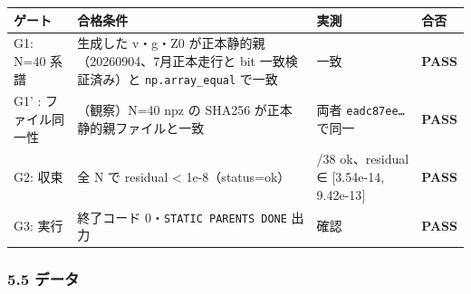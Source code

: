 \documentclass[
  a4paper,
]{ltjsarticle}
\newcounter{none} %
\begin{document}
{\def\LTcaptype{none} %
\begin{longtable}[]{@{}
  >{\raggedright\arraybackslash}p{}
  >{\raggedright\arraybackslash}p{}
  >{\raggedright\arraybackslash}p{}
  >{\raggedright\arraybackslash}p{}@{}}
\toprule\noalign{}
\begin{minipage}[b]{\linewidth}\raggedright
ゲート
\end{minipage} & \begin{minipage}[b]{\linewidth}\raggedright
合格条件
\end{minipage} & \begin{minipage}[b]{\linewidth}\raggedright
実測
\end{minipage} & \begin{minipage}[b]{\linewidth}\raggedright
合否
\end{minipage} \\
\midrule\noalign{}
\endhead
\bottomrule\noalign{}
\endlastfoot
G1: N=40 系譜 & 生成した v・g・Z0 が正本静的親（20260904、7月正本走行と
bit 一致検証済み）と \texttt{np.array\_equal} で一致 & 一致 &
\textbf{PASS} \\
G1' : ファイル同一性 & （観察）N=40 npz の SHA256
が正本静的親ファイルと一致 & 両者 \texttt{eadc87ee…} で同一 &
\textbf{PASS} \\
G2: 収束 & 全 N で residual \textless{} 1e-8（status=ok） & 38/38
ok、residual ∈ {[}3.54e-14, 9.42e-13{]} & \textbf{PASS} \\
G3: 実行 & 終了コード 0・\texttt{STATIC\ PARENTS\ DONE} 出力 & 確認 &
\textbf{PASS} \\
\end{longtable}
}

\subsubsection{5.5 データ}\label{ux30c7ux30fcux30bf}
\end{document}
